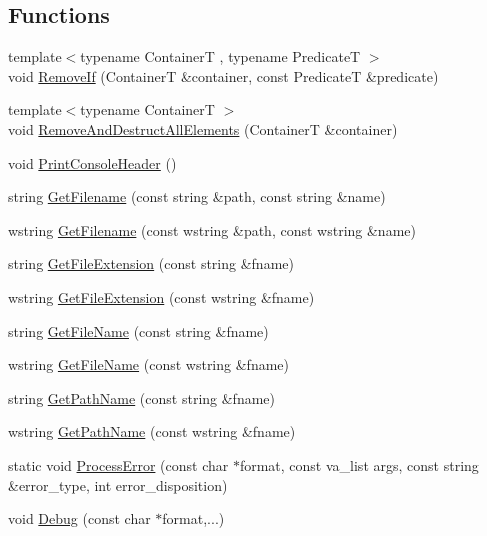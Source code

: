 \subsection*{Functions}
\begin{DoxyCompactItemize}
\item 
{\footnotesize template$<$typename ContainerT , typename PredicateT $>$ }\\void \hyperlink{namespacemage_a403ff95eb779de1fbbf139661feb2d1b}{Remove\+If} (ContainerT \&container, const PredicateT \&predicate)
\item 
{\footnotesize template$<$typename ContainerT $>$ }\\void \hyperlink{namespacemage_a56c8c38aee820faf885024ed22e70a8e}{Remove\+And\+Destruct\+All\+Elements} (ContainerT \&container)
\item 
void \hyperlink{namespacemage_a064756443bd8a1af6974f22c81d29ed0}{Print\+Console\+Header} ()
\item 
string \hyperlink{namespacemage_a74d063f352449eb92ca6d5faabb2f3cf}{Get\+Filename} (const string \&path, const string \&name)
\item 
wstring \hyperlink{namespacemage_aba14856287af620017274f19a4dda596}{Get\+Filename} (const wstring \&path, const wstring \&name)
\item 
string \hyperlink{namespacemage_aec46035d0a6e15632a44ac88619fb675}{Get\+File\+Extension} (const string \&fname)
\item 
wstring \hyperlink{namespacemage_ac95841e5c563311d50ef3524d5b7a8d8}{Get\+File\+Extension} (const wstring \&fname)
\item 
string \hyperlink{namespacemage_a83a9b478d1384147e758cd2edcd152a3}{Get\+File\+Name} (const string \&fname)
\item 
wstring \hyperlink{namespacemage_a04f348f48418c554940a817835b7a0c4}{Get\+File\+Name} (const wstring \&fname)
\item 
string \hyperlink{namespacemage_ac5c99281501e7af99e9fd0c332f0e113}{Get\+Path\+Name} (const string \&fname)
\item 
wstring \hyperlink{namespacemage_a171139f90ae3facdae52a61d5d73ddfa}{Get\+Path\+Name} (const wstring \&fname)
\item 
static void \hyperlink{namespacemage_a12282bdc04d00e024c5ddf93ed9ad785}{Process\+Error} (const char $\ast$format, const va\+\_\+list args, const string \&error\+\_\+type, int error\+\_\+disposition)
\item 
void \hyperlink{namespacemage_a1bcf1f0301e170105908eee5b5c46830}{Debug} (const char $\ast$format,...)

\end{DoxyCompactItemize}
